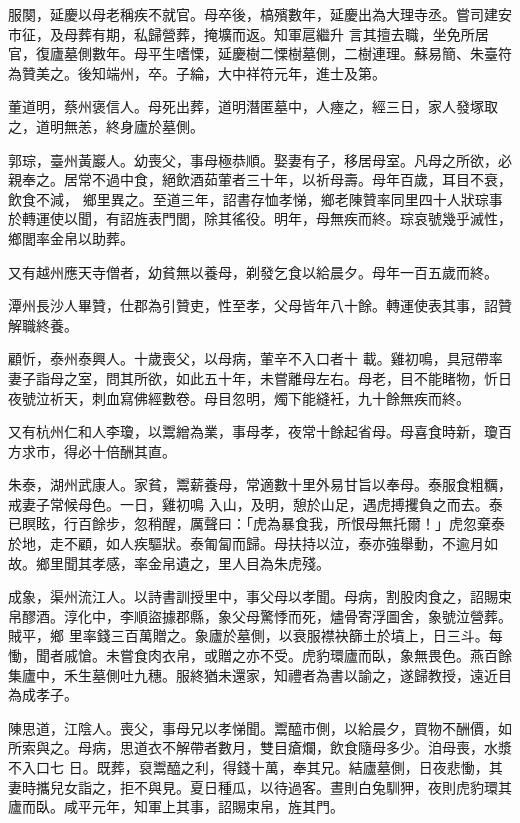 \begin{pinyinscope}
 服闋，延慶以母老稱疾不就官。母卒後，槁殯數年，延慶出為大理寺丞。嘗司建安市征，及母葬有期，私歸營葬，掩壙而返。知軍扈繼升
 言其擅去職，坐免所居官，復廬墓側數年。母平生嗜慄，延慶樹二慄樹墓側，二樹連理。蘇易簡、朱臺符為贊美之。後知端州，卒。子綸，大中祥符元年，進士及第。



 董道明，蔡州褒信人。母死出葬，道明潛匿墓中，人瘞之，經三日，家人發塚取之，道明無恙，終身廬於墓側。



 郭琮，臺州黃巖人。幼喪父，事母極恭順。娶妻有子，移居母室。凡母之所欲，必親奉之。居常不過中食，絕飲酒茹葷者三十年，以祈母壽。母年百歲，耳目不衰，飲食不減，
 鄉里異之。至道三年，詔書存恤孝悌，鄉老陳贊率同里四十人狀琮事於轉運使以聞，有詔旌表門閭，除其徭役。明年，母無疾而終。琮哀號幾乎滅性，鄉閭率金帛以助葬。



 又有越州應天寺僧者，幼貧無以養母，剃發乞食以給晨夕。母年一百五歲而終。



 潭州長沙人畢贊，仕郡為引贊吏，性至孝，父母皆年八十餘。轉運使表其事，詔贊解職終養。



 顧忻，泰州泰興人。十歲喪父，以母病，葷辛不入口者十
 載。雞初鳴，具冠帶率妻子詣母之室，問其所欲，如此五十年，未嘗離母左右。母老，目不能睹物，忻日夜號泣祈天，刺血寫佛經數卷。母目忽明，燭下能縫衽，九十餘無疾而終。



 又有杭州仁和人李瓊，以鬻繒為業，事母孝，夜常十餘起省母。母喜食時新，瓊百方求市，得必十倍酬其直。



 朱泰，湖州武康人。家貧，鬻薪養母，常適數十里外易甘旨以奉母。泰服食粗糲，戒妻子常候母色。一日，雞初鳴
 入山，及明，憩於山足，遇虎搏攫負之而去。泰已瞑眩，行百餘步，忽稍醒，厲聲曰：「虎為暴食我，所恨母無托爾！」虎忽棄泰於地，走不顧，如人疾驅狀。泰匍匐而歸。母扶持以泣，泰亦強舉動，不逾月如故。鄉里聞其孝感，率金帛遺之，里人目為朱虎殘。



 成象，渠州流江人。以詩書訓授里中，事父母以孝聞。母病，割股肉食之，詔賜束帛醪酒。淳化中，李順盜據郡縣，象父母驚悸而死，燼骨寄浮圖舍，象號泣營葬。賊平，鄉
 里率錢三百萬贈之。象廬於墓側，以衰服襟袂篩土於墳上，日三斗。每慟，聞者戚愴。未嘗食肉衣帛，或贈之亦不受。虎豹環廬而臥，象無畏色。燕百餘集廬中，禾生墓側吐九穗。服終猶未還家，知禮者為書以諭之，遂歸教授，遠近目為成孝子。



 陳思道，江陰人。喪父，事母兄以孝悌聞。鬻醯市側，以給晨夕，買物不酬價，如所索與之。母病，思道衣不解帶者數月，雙目瘡爛，飲食隨母多少。洎母喪，水漿不入口七
 日。既葬，裒鬻醯之利，得錢十萬，奉其兄。結廬墓側，日夜悲慟，其妻時攜兒女詣之，拒不與見。夏日種瓜，以待過客。晝則白兔馴狎，夜則虎豹環其廬而臥。咸平元年，知軍上其事，詔賜束帛，旌其門。




\end{pinyinscope}
